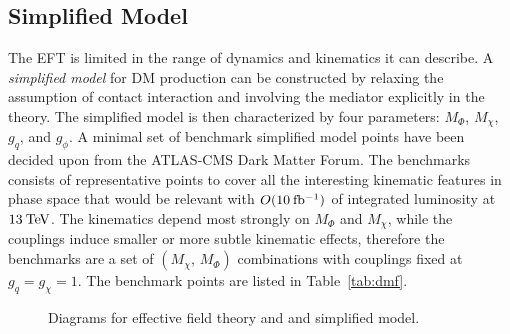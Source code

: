 \subsection{Simplified Model}
\label{subsec:intro_sms}
The EFT is limited in the range of dynamics and kinematics it can describe. A \emph{simplified model} for DM production can be constructed by relaxing the assumption of contact interaction and involving the mediator explicitly in the theory. The simplified model is then characterized by four parameters: $M_\Phi$, $M_\chi$, $g_q$, and $g_\phi$. A minimal set of benchmark simplified model points have been decided upon from the ATLAS-CMS Dark Matter Forum. The benchmarks consists of representative points to cover all the interesting kinematic features in phase space that would be relevant with $O(10\:\mathrm{fb^{-1}})$ of integrated luminosity at $13\:\mathrm{Te\kern -0.1em V}$. The kinematics depend most strongly on $M_\Phi$ and $M_\chi$, while the couplings induce smaller or more subtle kinematic effects, therefore the benchmarks are a set of $\left(M_\chi,\,M_\Phi\right)$ combinations with couplings fixed at $g_q=g_\chi=1$. The benchmark points are listed in Table~\ref{tab:dmf}.

\begin{figure}[!htbp]
\begin{center}
  \hspace{2cm}
  \caption{Diagrams for  effective field theory and  and simplified model.}
  \label{fig:ttdm_diagrams}
\end{center}
\end{figure}

